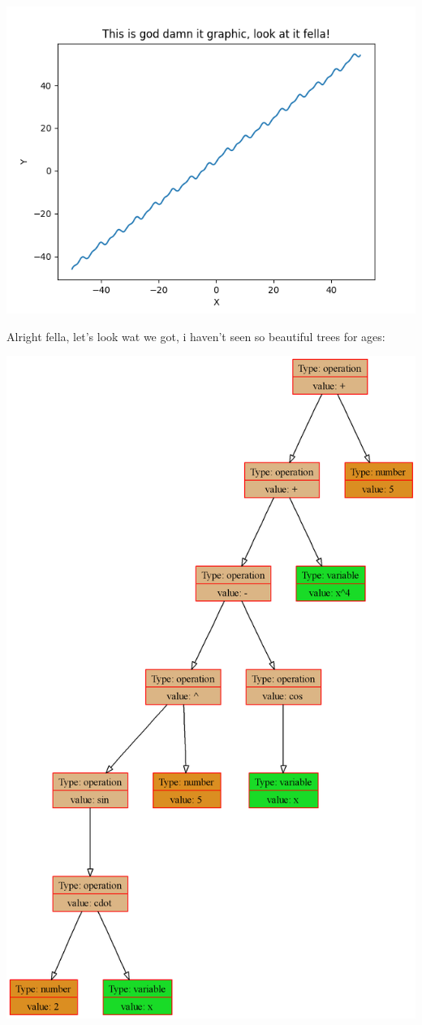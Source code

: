 \documentclass{article}
\begin{document}
    \begin{center} \includegraphics[scale=0.6]{function_graph.png} \end{center}Alright fella, let's look wat we got, i haven't seen so beautiful trees for ages:
\begin{center} \includegraphics[scale=0.2]{pretty_tree0.png} \end{center}
\end{document}
